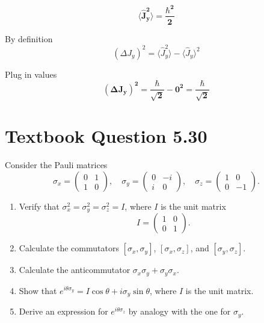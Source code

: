 \documentclass[12pt]{article}
\begin{document}
        \[
            \boldsymbol{\boxed{\langle \hat{J}_y^2 \rangle = \frac{\hbar^2}{2}}}
        \]

        By definition
        \[
            \left( \Delta J_y \right)^2 = \langle \hat{J}_y^2 \rangle - \langle \hat{J}_y \rangle^2
        \]

        Plug in values 
        \[
            \boldsymbol{\boxed{\left( \Delta J_y \right)^2 = \frac{\hbar}{\sqrt{2}} - 0^2 = \frac{\hbar}{\sqrt{2}}}}
        \]

\section{Textbook Question 5.30}
    Consider the Pauli matrices
    \[
        \sigma_x = \begin{pmatrix} 0 & 1 \\ 1 & 0 \end{pmatrix}, \quad
        \sigma_y = \begin{pmatrix} 0 & -i \\ i & 0 \end{pmatrix}, \quad
        \sigma_z = \begin{pmatrix} 1 & 0 \\ 0 & -1 \end{pmatrix}.
    \]
    
    \begin{enumerate}
        \item[(a)] Verify that $\sigma_x^2 = \sigma_y^2 = \sigma_z^2 = I$, where $I$ is the unit matrix
        \[
            I = \begin{pmatrix} 1 & 0 \\ 0 & 1 \end{pmatrix}.
        \]
        \item[(b)] Calculate the commutators $[\sigma_x, \sigma_y]$, $[\sigma_x, \sigma_z]$, and $[\sigma_y, \sigma_z]$.
        \item[(c)] Calculate the anticommutator $\sigma_x \sigma_y + \sigma_y \sigma_x$.
        \item[(d)] Show that $e^{i \theta \sigma_y} = I \cos \theta + i \sigma_y \sin \theta$, where $I$ is the unit matrix.
        \item[(e)] Derive an expression for $e^{i \theta \sigma_z}$ by analogy with the one for $\sigma_y$.
    \end{enumerate}
\end{document}
